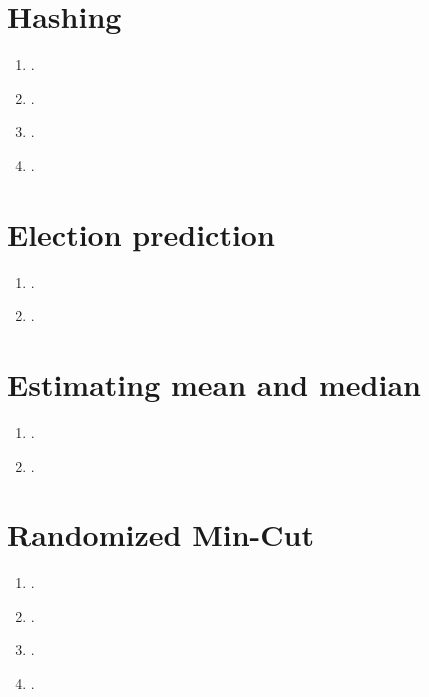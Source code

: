 \documentclass{article}
\begin{document}
	\section{Hashing}
		\begin{enumerate}
			\item .
			\item .
			\item .
			\item .
		\end{enumerate}

	\section{Election prediction}
		\begin{enumerate}
			\item .
			\item .
		\end{enumerate}

	\section{Estimating mean and median}
		\begin{enumerate}
			\item .
			\item .
		\end{enumerate}

	\section{Randomized Min-Cut}
		\begin{enumerate}
			\item .
			\item .
			\item .
			\item .
		\end{enumerate}
\end{document}
